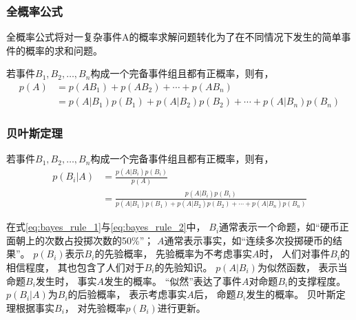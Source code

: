\subsubsection{全概率公式}

全概率公式将对一复杂事件A的概率求解问题转化为了在不同情况下发生的简单事件的概率的求和问题。

若事件{$B_1,B_2,\dots,B_n$}构成一个完备事件组且都有正概率，则有，
\begin{align}
    p(A)
    & =p(AB_1)+p(AB_2)+ \cdots +p(AB_n) \label{eq:total_probability_theorem_1}\\
    & =p(A|B_1)p(B_1)+p(A|B_2)p(B_2)+ \cdots + p(A|B_n)p(B_n) \label{eq:total_probability_theorem_2}
\end{align}




\subsubsection{贝叶斯定理}
若事件{$B_1,B_2,\dots,B_n$}构成一个完备事件组且都有正概率，则有，
\begin{align}
    p(B_i|A)
    & =\frac{p(A|B_i)p(B_i)}{p(A)} \label{eq:bayes_rule_1}\\
    & =\frac{p(A|B_i)p(B_i)}{p(A|B_1)p(B_1)+p(A|B_2)p(B_2)+ \cdots +p(A|B_n)p(B_n)} \label{eq:bayes_rule_2}
\end{align}

在式{\ref{eq:bayes_rule_1}}与{\ref{eq:bayes_rule_2}}中，
{$B_i$}通常表示一个命题，如“硬币正面朝上的次数占投掷次数的50\%”；
{$A$}通常表示事实，如“连续多次投掷硬币的结果”。
{$p(B_i)$}表示{$B_i$}的先验概率，
先验概率为不考虑事实{$A$}时，
人们对事件{$B_i$}的相信程度，
其也包含了人们对于{$B_i$}的先验知识。
{$p(A|B_i)$}为似然函数，
表示当命题{$B_i$}发生时，
事实{$A$}发生的概率。
“似然”表达了事件{$A$}对命题{$B_i$}的支撑程度。
{$p(B_i|A)$}为{$B_i$}的后验概率，
表示考虑事实{$A$}后，
命题{$B_i$}发生的概率。
贝叶斯定理根据事实{$B_i$}，
对先验概率{$p(B_i)$}进行更新。

